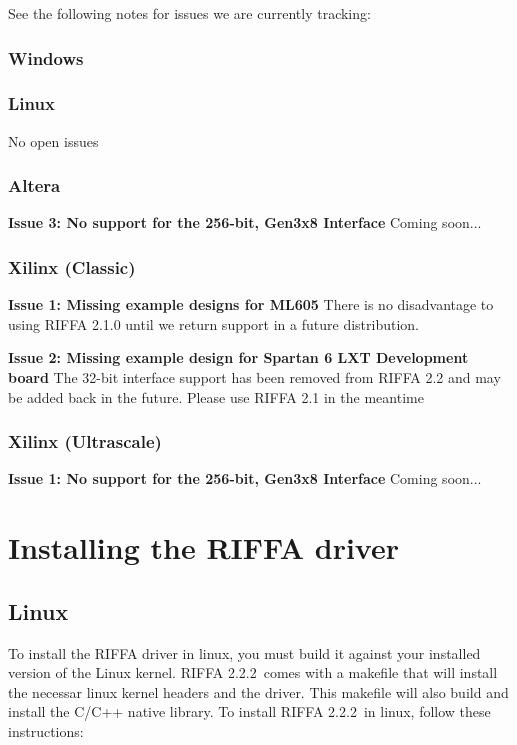 \documentclass{refrep}
\newcommand{\RIFFAVer}{2.2.2}
\begin{document}
See the following notes for issues we are currently tracking:

\subsection{Windows}
\subsection{Linux}
No open issues
\subsection{Altera}

\textbf{Issue 3: No support for the 256-bit, Gen3x8 Interface} Coming soon...
\subsection{Xilinx (Classic)}

\textbf{Issue 1: Missing example designs for ML605} There is no disadvantage to
using RIFFA 2.1.0 until we return support in a future distribution.

\textbf{Issue 2: Missing example design for Spartan 6 LXT Development board} The
32-bit interface support has been removed from RIFFA 2.2 and may be added back
in the future. Please use RIFFA 2.1 in the meantime

\subsection{Xilinx (Ultrascale)}
\textbf{Issue 1: No support for the 256-bit, Gen3x8 Interface} Coming soon...

\pagebreak

\chapter{Installing the RIFFA driver}
\label{Sec:RIFFA:Installation}
\section{Linux}
To install the RIFFA driver in linux, you must build it against your installed
version of the Linux kernel. RIFFA \RIFFAVer~comes with a makefile that will
install the necessar linux kernel headers and the driver. This makefile will
also build and install the C/C++ native library. To install RIFFA \RIFFAVer~in
linux, follow these instructions:
\end{document}

